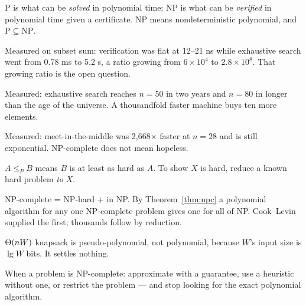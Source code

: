 \begin{chaptersummary}
\begin{tight}
  \item P is what can be \emph{solved} in polynomial time; NP is what can be
        \emph{verified} in polynomial time given a certificate. NP means
        nondeterministic polynomial, and $\mathrm{P} \subseteq \mathrm{NP}$.
  \item Measured on subset sum: verification was flat at 12--21 ns while
        exhaustive search went from 0.78 ms to 5.2 s, a ratio growing from
        $6\times10^{4}$ to $2.8\times10^{8}$. That growing ratio is the open
        question.
  \item Measured: exhaustive search reaches $n = 50$ in two years and $n = 80$
        in longer than the age of the universe. A thousandfold faster machine
        buys ten more elements.
  \item Measured: meet-in-the-middle was 2{,}668$\times$ faster at $n = 28$ and
        is still exponential. NP-complete does not mean hopeless.
  \item $A \le_{P} B$ means $B$ is at least as hard as $A$. To show $X$ is
        hard, reduce a known hard problem \emph{to} $X$.
  \item NP-complete = NP-hard + in NP. By Theorem~\ref{thm:npc} a polynomial
        algorithm for any one NP-complete problem gives one for all of NP.
        Cook--Levin supplied the first; thousands follow by reduction.
  \item $\Theta(nW)$ knapsack is pseudo-polynomial, not polynomial, because
        $W$'s input size is $\lg W$ bits. It settles nothing.
  \item When a problem is NP-complete: approximate with a guarantee, use a
        heuristic without one, or restrict the problem --- and stop looking for
        the exact polynomial algorithm.
\end{tight}
\end{chaptersummary}

